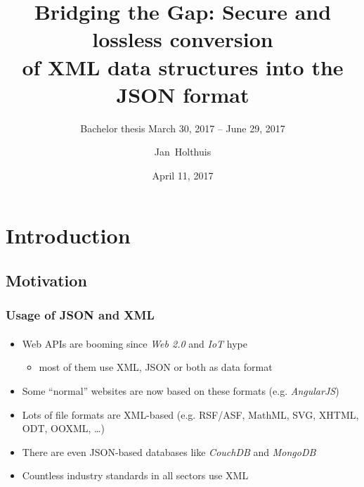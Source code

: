 \documentclass[
    alternativetitlepage=alternativ,
    cornerlogo=hgi_nds_logo2,
    sectionoverview,
]{rubpresentation}
\title[XML/JSON conversions]
{Bridging the Gap: Secure and lossless conversion\\ of XML data structures into the JSON format}
\subtitle{\small Bachelor thesis \hspace{3mm}{\scriptsize $\blacksquare$}\hspace{3mm} March 30, 2017 -- June 29, 2017}
\author[Holthuis]{Jan~Holthuis}
\institute[Advisors]
{%
Advisors: Dennis Felsch \& Paul Rösler
}
\date{April 11, 2017}
\begin{document}
\frame[plain]{\titlepage}




\section{Introduction}


\subsection{Motivation}

\begin{frame}
    \frametitle{Usage of JSON and XML}
    \framesubtitle{}
    \begin{itemize}
        \item{} Web APIs are booming since \emph{Web 2.0} and \emph{IoT} hype
            \begin{itemize}
                \item{} most of them use XML, JSON or both as data format
            \end{itemize}
        \item{} Some \enquote{normal} websites are now based on these formats (e.g. \emph{AngularJS})\\
        \item{} Lots of file formats are XML-based (e.g. RSF/ASF, MathML, SVG, XHTML, ODT, OOXML, \ldots{})\\
        \item{} There are even JSON-based databases like \emph{CouchDB} and \emph{MongoDB}\\
        \item{} Countless industry standards in all sectors use XML
    \end{itemize}
\end{frame}
\end{document}
